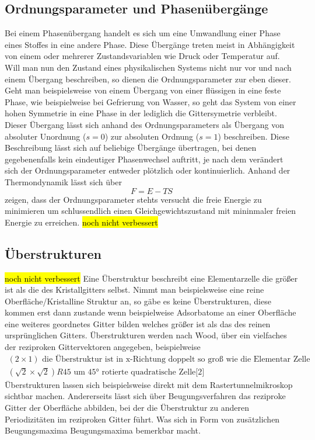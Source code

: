     \subsection{Ordnungsparameter und Phasenübergänge}
       Bei einem Phasenübergang handelt es sich um eine Umwandlung einer Phase eines Stoffes in 
       eine andere Phase. Diese Übergänge treten meist in Abhängigkeit von einem oder mehrerer Zustandsvariablen
       wie Druck oder Temperatur auf.\\
       Will man nun den Zustand eines physikalischen Systems nicht nur vor und nach einem Übergang beschreiben,
       so dienen die Ordnungsparameter zur eben dieser. Geht man beispielsweise von einem Übergang von einer
       flüssigen in eine feste Phase, wie beispielweise bei Gefrierung von Wasser, so geht das System von einer
       hohen Symmetrie in eine Phase in der lediglich die Gittersymetrie verbleibt. Dieser Übergang lässt sich
       anhand des Ordnungsparameters als Übergang von absoluter Unordnung ($s=0$) zur absoluten Ordnung
       ($s=1$) beschreiben. Diese Beschreibung lässt sich auf beliebige Übergänge übertragen, bei denen
       gegebenenfalls kein eindeutiger Phasenwechsel auftritt, je nach dem verändert sich der Ordnungsparameter
       entweder plötzlich oder kontinuierlich. Anhand der Thermondynamik lässt sich über
       \begin{equation}
           F = E-TS
       \end{equation}
       zeigen, dass der Ordnungsparameter stehts versucht die freie Energie zu minimieren um schlussendlich
       einen Gleichgewichtszustand mit mininmaler freien Energie zu erreichen. \hl{noch nicht verbessert} 

    \subsection{Überstrukturen}
        \hl{noch nicht verbessert} 
        Eine Überstruktur beschreibt eine Elementarzelle die größer ist als die des Kristallgitters selbst.
        Nimmt man beispielsweise eine reine Oberfläche/Kristalline Struktur an, so
        gäbe es keine Überstrukturen, diese kommen erst dann zustande wenn beispielweise Adsorbatome an einer Oberfläche
        eine weiteres geordnetes Gitter bilden welches größer ist als das des reinen ursprünglichen Gitters.
        Überstrukturen werden nach Wood, über ein vielfaches der reziproken Gittervektoren angegeben, beispielweise
        \begin{align*}
            (2\times1) \text{  die Überstruktur ist in x-Richtung doppelt so groß wie die Elementar Zelle}\\
            (\sqrt{2}\times\sqrt{2})R45 \text{  um 45° rotierte quadratische Zelle[2]}
        \end{align*}
        Überstrukturen lassen sich beispielsweise direkt mit dem Rastertunnelmikroskop sichtbar machen.
        Andererseits lässt sich über Beugungsverfahren das reziproke Gitter der Oberfläche abbilden, bei der die
        Überstruktur zu anderen Periodizitäten im reziproken Gitter führt. Was sich in Form von zusätzlichen Beugungsmaxima 
        Beugungsmaxima bemerkbar macht.

